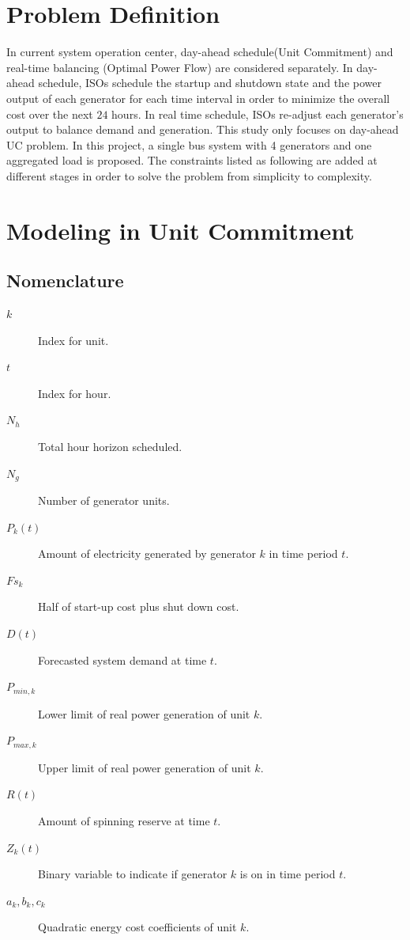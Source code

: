 \documentclass[a4paper, 12pt, notitlepage]{report}
\begin{document}
\section{Problem Definition}
%
In current system operation center, day-ahead schedule(Unit Commitment) and real-time balancing (Optimal Power Flow) are considered separately. In day-ahead schedule, ISOs schedule the startup and shutdown state and the power output of each generator for each time interval in order to minimize the overall cost over the next $24$ hours. In real time schedule, ISOs re-adjust each generator's output to balance demand and generation. This study only focuses on day-ahead UC problem.
In this project, a single bus system with 4 generators and one aggregated load is proposed. The constraints listed as following are added at different stages in order to solve the problem from simplicity to complexity.

\section{Modeling in Unit Commitment}

\subsection{Nomenclature}
\begin{description}
\item[$k$]Index for unit.
\item[$t$]Index for hour.
\item[$N_h$]Total hour horizon scheduled.
\item[$N_g$]Number of generator units.
\item[$P_k(t)$]Amount of electricity generated by generator $k$ in time period $t$.
\item[$Fs_{k}$]Half of start-up cost plus shut down cost.
\item[$D(t)$]Forecasted system demand at time $t$.
\item[$P_{min,k}$]Lower limit of real power generation of unit $k$.
\item[$P_{max,k}$]Upper limit of real power generation of unit $k$.
\item[$R(t)$]Amount of spinning reserve at time $t$.
\item[$Z_k(t)$]Binary variable to indicate if generator $k$ is on in time period $t$.
\item[$a_k,b_k,c_k$]Quadratic energy cost coefficients of unit $k$.
\end{description}
\end{document}
